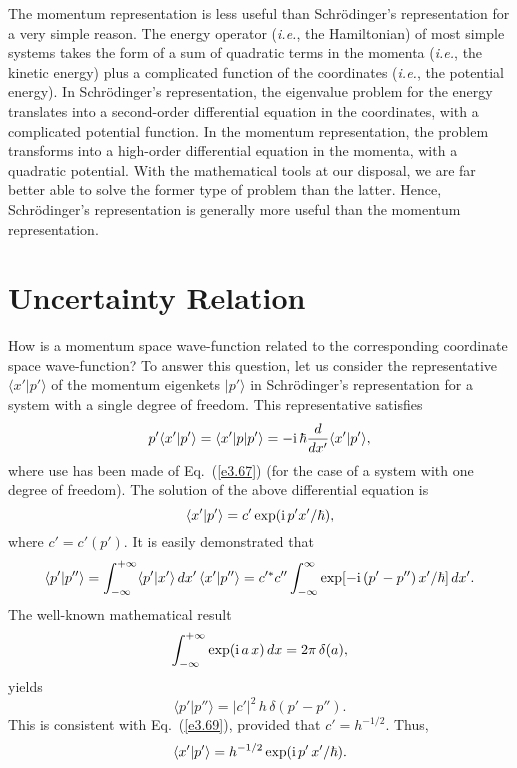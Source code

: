 The momentum representation is less useful than Schr\"{o}dinger's representation
for  a very simple reason. The energy operator ({\em i.e.}, the Hamiltonian) of
most simple systems takes the form of a sum of quadratic terms in the momenta
({\em i.e.}, the kinetic energy) plus a complicated function of the coordinates
({\em i.e.}, the potential energy). In Schr\"{o}dinger's representation,
the eigenvalue problem for the energy translates into a second-order differential
equation in the coordinates, with a complicated potential function. In the
momentum representation, the problem transforms into a high-order differential
equation in the momenta, with a quadratic potential. With the mathematical
tools at our disposal, we are far better able to solve the former type of problem
than the latter. Hence, Schr\"{o}dinger's representation is
generally more useful than the momentum representation. 

\section{Uncertainty Relation}
How is a momentum space wave-function related to the corresponding coordinate
space wave-function? To answer this question, let us consider the
representative $\langle x'|p'\rangle$ of the
 momentum eigenkets $|p'\rangle$ in Schr\"{o}dinger's representation
for a system with a single degree of freedom. This representative satisfies
\begin{equation}
p' \langle x'|p'\rangle = \langle x'|p|p'\rangle = -{\rm i}\,\hbar\frac{d}{dx'}
\langle x'|p'\rangle,
\end{equation}
where use has been made of Eq.~(\ref{e3.67}) (for the case of a system with one
degree of freedom). The solution of the above  differential equation is
\begin{equation}
\langle x' | p'\rangle = c' \exp({\rm i}\, p' x'/\hbar),
\end{equation}
where $c' = c'(p')$. It is easily demonstrated that
\begin{equation}
\langle p'|p''\rangle = \int_{-\infty}^{+\infty} \langle p'|x'\rangle \,dx'\,
\langle x'|p''\rangle = c'^\ast c'' \int_{-\infty}^{\infty}\exp[-{\rm i}\,
(p'-p'')\,x'/\hbar]\,dx'.
\end{equation}
The well-known mathematical result
\begin{equation}\label{e3.83}
\int_{-\infty}^{+\infty} \exp({\rm i}\, a\,x)\,dx = 2\pi\,\delta (a),
\end{equation}
yields
\begin{equation}
\langle p'|p''\rangle = |c'|^2 \, h\, \delta(p'-p'').
\end{equation}
This is consistent with Eq.~(\ref{e3.69}), provided that $c' = h^{-1/2}$. Thus,
\begin{equation}\label{e3.85}
\langle x'|p'\rangle = h^{-1/2} \exp({\rm i}\, p'\, x'/\hbar).
\end{equation}

